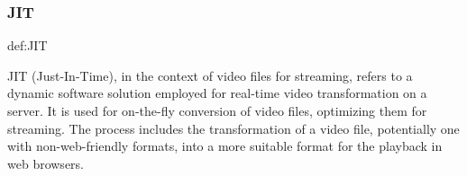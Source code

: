 \documentclass[../MasterThesis.tex]{subfiles}
\begin{document}
\subsubsection*{JIT} 
%
\begin{CountingDefinition}[JIT]{def:JIT}
	
	JIT (Just-In-Time), in the context of video files for streaming, refers to a dynamic software solution employed for real-time video transformation on a server. It is used for on-the-fly conversion of video files, optimizing them for streaming. The process includes the transformation of a video file, potentially one with non-web-friendly formats, into a more suitable format for the playback in web browsers.
	
\end{CountingDefinition}






	
	
	
	
\end{document}
